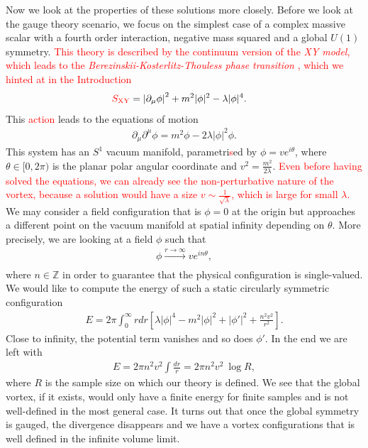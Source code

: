         Now we look at the properties of these solutions more closely. Before we look at the gauge theory scenario, we focus on the simplest case of a complex massive scalar with a fourth order interaction, negative mass squared and a global $U(1)$ symmetry. \textcolor{red}{This theory is described by the continuum version of the \textit{XY model}, which leads to the \textit{Berezinskii-Kosterlitz-Thouless phase transition} \cite{Kosterlitz_1973, Berezinsky:1970fr, Berezinsky:1972rfj}, which we hinted at in the Introduction}
        \begin{align}
            \textcolor{red}{S_{\text{XY}}} &=  \left|\partial_{\mu} \phi \right|^2 + m^2 | \phi |^2 - \lambda |\phi|^4.
        \end{align}
    This \textcolor{red}{action} leads to the equations of motion
    \begin{align}
        \partial_{\mu} \partial^{\mu} \phi = m^2 \phi - 2\lambda |\phi|^2 \phi.
    \end{align}
    This system has an $S^1$ vacuum manifold, parametri\textcolor{red}{s}ed by $\phi = v e^{i \theta}$, where $\theta \in [0,2\pi)$ is the planar polar angular coordinate and $v^2 = \frac{m^2}{2 \lambda}$. \textcolor{red}{Even before having solved the equations, we can already see the non-perturbative nature of the vortex, because a solution would have a size $v\sim \frac{1}{\sqrt{\lambda}}$, which is large for small $\lambda$.}\\
    \indent We may consider a field configuration that is $\phi=0$ at the origin but approaches a different point on the vacuum manifold at spatial infinity depending on $\theta$. More precisely, we are looking at a field $\phi$ such that
    \begin{align}
        \phi \xrightarrow[]{r\rightarrow \infty} v e^{i n\theta},
    \end{align}
    where $n \in \mathbb{Z}$ in order to guarantee that the physical configuration is single-valued.
    We would like to compute the energy of such a static circularly symmetric configuration
    \begin{align}
        E= 2 \pi \int_0^{\infty} r dr \left[\lambda |\phi|^4 - m^2 |\phi|^2 + |\phi'|^2 + \frac{n^2 v^2}{r^2} \right].
    \end{align}
    Close to infinity, the potential term vanishes and so does $\phi'$. In the end we are left with
    \begin{align}
        E = 2\pi n^2 v^2 \int \frac{dr}{r} =  2\pi n^2 v^2  \ \log R,
    \end{align}
    where $R$ is the sample size on which our theory is defined. We see that the global vortex, if it exists, would only have a finite energy for finite samples and is not well-defined in the most general case. It turns out that once the global symmetry is gauged, the divergence disappears and we have a vortex configurations that is well defined in the infinite volume limit.
